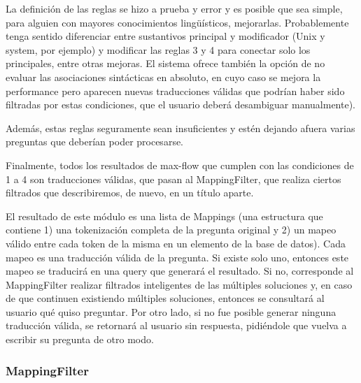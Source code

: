 La definición de las reglas se hizo a prueba y error y es posible que sea simple, para alguien con mayores conocimientos lingüísticos, mejorarlas. Probablemente tenga sentido diferenciar entre sustantivos principal y modificador (Unix y system, por ejemplo) y modificar las reglas 3 y 4 para conectar solo los principales, entre otras mejoras. El sistema ofrece también la opción de no evaluar las asociaciones sintácticas en absoluto, en cuyo caso se mejora la performance pero aparecen nuevas traducciones válidas que podrían haber sido filtradas por estas condiciones, que el usuario deberá desambiguar manualmente).

Además, estas reglas seguramente sean insuficientes y estén dejando afuera varias preguntas que deberían poder procesarse.

Finalmente, todos los resultados de max-flow que cumplen con las condiciones de 1 a  4 son traducciones válidas, que pasan al MappingFilter, que realiza ciertos filtrados que describiremos, de nuevo, en un título aparte.

El resultado de este módulo es una lista de Mappings (una estructura que contiene 1) una tokenización completa de la pregunta original y 2) un mapeo válido entre cada token de la misma en un elemento de la base de datos). Cada mapeo es una traducción válida de la pregunta. Si existe solo uno, entonces este mapeo se traducirá en una query que generará el resultado. Si no, corresponde al MappingFilter realizar filtrados inteligentes de las múltiples soluciones y, en caso de que continuen existiendo múltiples soluciones, entonces se consultará al usuario qué quiso preguntar. Por otro lado, si no fue posible generar ninguna traducción válida, se retornará al usuario sin respuesta, pidiéndole que vuelva a escribir su pregunta de otro modo.

\subsubsection*{MappingFilter}
\label{subsubsec:mapping-filter}

